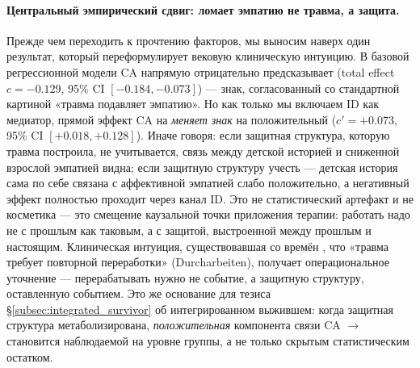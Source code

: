 \paragraph{Центральный эмпирический сдвиг: ломает эмпатию не травма, а защита.} Прежде чем переходить к прочтению факторов, мы выносим наверх один результат, который переформулирует вековую клиническую интуицию. В базовой регрессионной модели CA напрямую отрицательно предсказывает \EAF{} (total effect $c = -0.129$, 95\% CI $[-0.184, -0.073]$) --- знак, согласованный со стандартной картиной «травма подавляет эмпатию». Но как только мы включаем ID как медиатор, прямой эффект CA на \EAF{} \emph{меняет знак} на положительный ($c' = +0.073$, 95\% CI $[+0.018, +0.128]$). Иначе говоря: если защитная структура, которую травма построила, не учитывается, связь между детской историей и сниженной взрослой эмпатией видна; если защитную структуру учесть --- детская история сама по себе связана с аффективной эмпатией слабо положительно, а негативный эффект полностью проходит через канал ID. Это не статистический артефакт и не косметика --- это смещение каузальной точки приложения терапии: работать надо не с прошлым как таковым, а с защитой, выстроенной между прошлым и настоящим. Клиническая интуиция, существовавшая со времён \citet{freud1917}, что «травма требует повторной переработки» (Durcharbeiten), получает операциональное уточнение --- перерабатывать нужно не событие, а защитную структуру, оставленную событием. Это же основание для тезиса §\ref{subsec:integrated_survivor} об интегрированном выжившем: когда защитная структура метаболизирована, \emph{положительная} компонента связи CA $\to$ \EAF{} становится наблюдаемой на уровне группы, а не только скрытым статистическим остатком.

